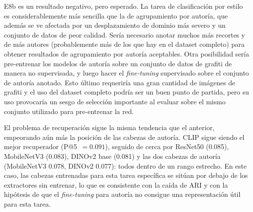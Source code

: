E8b es un resultado negativo, pero esperado. La tarea de clasificación por
estilo es considerablemente más sencilla que la de agrupamiento por autoría,
que además se ve afectada por un desplazamiento de dominio más severo y un
conjunto de datos de peor calidad. Sería necesario anotar muchos más recortes y
de más autores (probablemente más de los que hay en el dataset completo) para
obtener resultados de agrupamiento por autoría aceptables. Otra posibilidad
sería pre-entrenar los modelos de autoría sobre un conjunto de datos de grafiti
de manera no supervisada, y luego hacer el \textit{fine-tuning} supervisado
sobre el conjunto de autoría anotado. Esto último requeriría una gran cantidad
de imágenes de grafiti y el uso del dataset completo podría ser un buen punto de
partida, pero su uso provocaría un sesgo de selección importante al evaluar
sobre el mismo conjunto utilizado para pre-entrenar la red.

El problema de recuperación sigue la misma tendencia que el anterior,
empeorando aún más la posición de las cabezas de autoría. CLIP sigue siendo el
mejor recuperador (P@5~$=0.091$), seguido de cerca por ResNet50 (0.085),
MobileNetV3 (0.083), DINOv2 base (0.081) y las dos cabezas de autoría
(MobileNetV3 0.078, DINOv2 0.077): todos dentro de un rango estrecho. En este
caso, las cabezas entrenadas para esta tarea específica se sitúan por debajo de
los extractores sin entrenar, lo que es consistente con la caída de ARI y con
la hipótesis de que el \textit{fine-tuning} para autoría no consigue una
representación útil para esta tarea.

